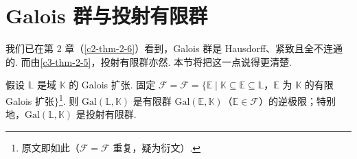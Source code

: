 \section{Galois 群与投射有限群}

我们已在第 2 章（\autoref{c2-thm-2-6}）看到，Galois 群是 Hausdorff、紧致且全不连通的. 而由\autoref{c3-thm-2-5}，投射有限群亦然. 本节将把这一点说得更清楚.

\begin{theorem}\label{c3-thm-3-1}
假设 $\mathbb{L}$ 是域 $\mathbb{K}$ 的 Galois 扩张. 固定 $\mathcal{F}=\mathcal{F}=\{\mathbb{E}\mid \mathbb{K}\subseteq\mathbb{E}\subseteq\mathbb{L}$，$\mathbb{E}$ 为 $\mathbb{K}$ 的有限 Galois 扩张$\}$\footnote{原文即如此（$\mathcal{F}=\mathcal{F}$ 重复，疑为衍文）.}. 则 $\mathrm{Gal}(\mathbb{L},\mathbb{K})$ 是有限群 $\mathrm{Gal}(\mathbb{E},\mathbb{K})$（$\mathbb{E}\in\mathcal{F}$）的逆极限；特别地，$\mathrm{Gal}(\mathbb{L},\mathbb{K})$ 是投射有限群.
\end{theorem}

